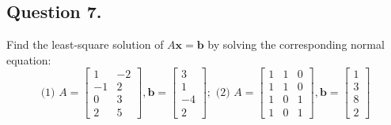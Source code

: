 \documentclass{article}
\begin{document}
\subsection*{Question 7.}
Find the least-square solution of $A\mathbf{x}=\mathbf{b}$ by solving the corresponding normal equation:
\[\text{(1)   }
A=\left[
\begin{array}{rr}
 1 & -2 \\
-1 &  2 \\
 0 &  3 \\
 2 & 5
\end{array}
\right], \mathbf{b}=\left[\begin{array}{r}3\\1\\-4\\2\end{array}\right];
\text{    (2)   }
A=\left[
\begin{array}{rrr}
 1 &  1  & 0 \\
 1 &  1  & 0 \\
 1 &  0  & 1 \\
 1 &  0  & 1
\end{array}
\right], \mathbf{b}=\left[\begin{array}{r}1\\3\\8\\2\end{array}\right]
\]
\end{document}
